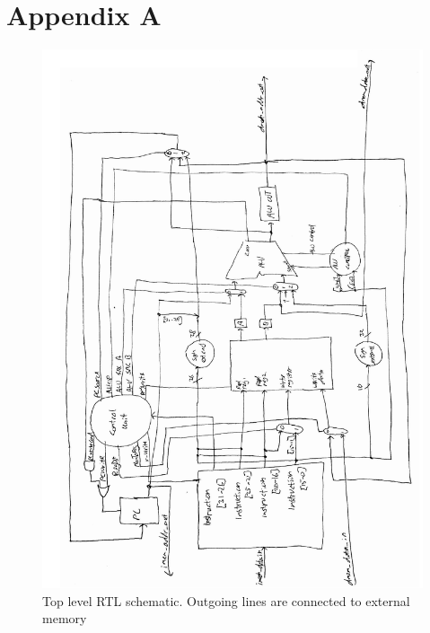 \section{Appendix A}

\begin{figure}[ht!]
    \begin{center}
    \includegraphics[width=\textwidth]{assets/top_level_rtl.pdf}
    \caption{Top level RTL schematic. Outgoing lines are connected to external memory}
    \label{fig:top_level_rtl}
    \end{center}
\end{figure}

